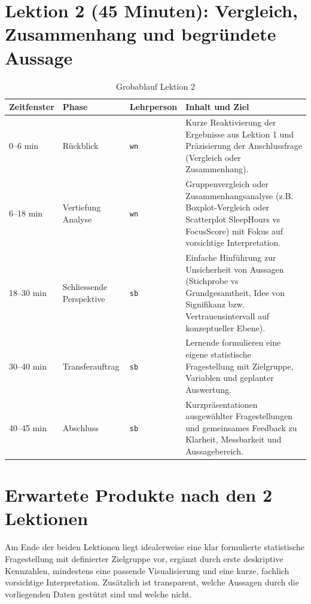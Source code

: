 \section{Lektion 2 (45 Minuten): Vergleich, Zusammenhang und begründete Aussage}

\begin{table}[H]
	\centering
	\small
	\begin{tabular}{p{} p{} p{} p{}}
		\toprule
		\textbf{Zeitfenster} & \textbf{Phase} & \textbf{Lehrperson} & \textbf{Inhalt und Ziel} \\
		\midrule
		0--6 min  & Rückblick & \texttt{wn} & Kurze Reaktivierung der Ergebnisse aus Lektion 1 und Präzisierung der Anschlussfrage (Vergleich oder Zusammenhang). \\
		6--18 min & Vertiefung Analyse & \texttt{wn} & Gruppenvergleich oder Zusammenhangsanalyse (z.B. Boxplot-Vergleich oder Scatterplot SleepHours vs FocusScore) mit Fokus auf vorsichtige Interpretation. \\
		18--30 min & Schliessende Perspektive & \texttt{sb} & Einfache Hinführung zur Unsicherheit von Aussagen (Stichprobe vs Grundgesamtheit, Idee von Signifikanz bzw. Vertrauensintervall auf konzeptueller Ebene). \\
		30--40 min & Transferauftrag & \texttt{sb} & Lernende formulieren eine eigene statistische Fragestellung mit Zielgruppe, Variablen und geplanter Auswertung. \\
		40--45 min & Abschluss & \texttt{sb} & Kurzpräsentationen ausgewählter Fragestellungen und gemeinsames Feedback zu Klarheit, Messbarkeit und Aussagebereich. \\
		\bottomrule
	\end{tabular}
	\caption{Grobablauf Lektion 2}
\end{table}

\section{Erwartete Produkte nach den 2 Lektionen}

Am Ende der beiden Lektionen liegt idealerweise eine klar formulierte statistische Fragestellung mit definierter Zielgruppe vor,
ergänzt durch erste deskriptive Kennzahlen, mindestens eine passende Visualisierung und eine kurze, fachlich vorsichtige Interpretation.
Zusätzlich ist transparent, welche Aussagen durch die vorliegenden Daten gestützt sind und welche nicht.

\restoregeometry